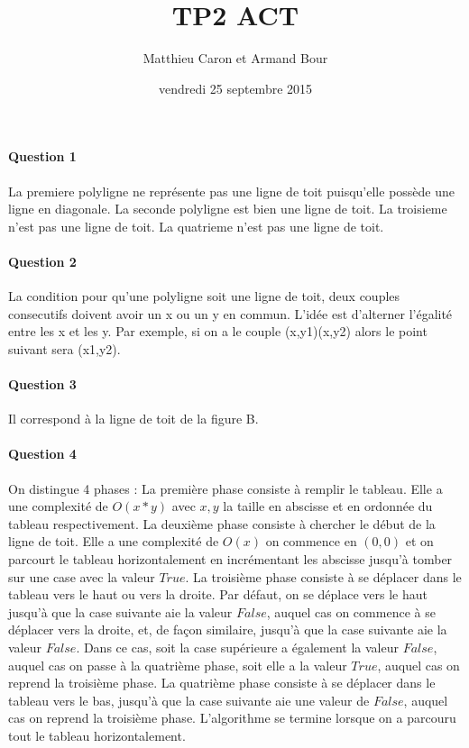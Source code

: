 \documentclass[a4paper,10pt]{article}
\title{TP2 ACT}
\author{Matthieu Caron et Armand Bour}
\date{vendredi 25 septembre 2015}
\begin{document}
\maketitle

\paragraph{Question 1}
La premiere polyligne ne représente pas une ligne de toit puisqu'elle possède une ligne en diagonale.\newline
La seconde polyligne est bien une ligne de toit.\newline
La troisieme n'est pas une ligne de toit.\newline
La quatrieme n'est pas une ligne de toit.\newline
\paragraph{Question 2}
La condition pour qu'une polyligne soit une ligne de toit, deux couples consecutifs doivent avoir un x ou un y en commun.
L'idée est d'alterner l'égalité entre les x et les y.
Par exemple, si on a le couple (x,y1)(x,y2) alors le point suivant sera (x1,y2). 
\paragraph{Question 3}
Il correspond à la ligne de toit de la figure B.
\paragraph{Question 4}
On distingue 4 phases : \newline
La première phase consiste à remplir le tableau. Elle a une complexité de $O(x*y)$ avec $x,y$ la taille en abscisse et en ordonnée du tableau respectivement.\newline
La deuxième phase consiste à chercher le début de la ligne de toit. Elle a une complexité de $O(x)$ on commence en $(0,0)$ et 
on parcourt le tableau horizontalement en incrémentant les abscisse jusqu'à tomber sur une case avec la valeur $True$.\newline
La troisième phase consiste à se déplacer dans le tableau vers le haut ou vers la droite. Par défaut, on se déplace vers le haut jusqu'à que la case suivante aie la valeur $False$, auquel cas on commence à se déplacer vers la droite, et, de façon similaire, jusqu'à que la case suivante aie la valeur $False$. Dans ce cas, soit la case supérieure a également la valeur $False$, auquel cas on passe à la quatrième phase, soit elle a la valeur $True$, auquel cas on reprend la troisième phase.\newline
La quatrième phase consiste à se déplacer dans le tableau vers le bas, jusqu'à que la case suivante aie une valeur de $False$, auquel cas on reprend la troisième phase.\newline
L'algorithme se termine lorsque on a parcouru tout le tableau horizontalement.\newline
\end{document}
